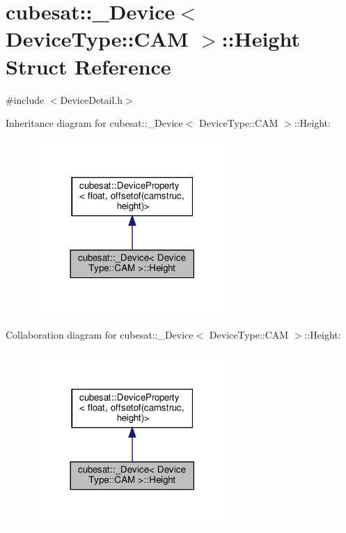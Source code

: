\hypertarget{structcubesat_1_1__Device_3_01DeviceType_1_1CAM_01_4_1_1Height}{}\section{cubesat\+:\+:\+\_\+\+Device$<$ Device\+Type\+:\+:C\+AM $>$\+:\+:Height Struct Reference}
\label{structcubesat_1_1__Device_3_01DeviceType_1_1CAM_01_4_1_1Height}


{\ttfamily \#include $<$Device\+Detail.\+h$>$}



Inheritance diagram for cubesat\+:\+:\+\_\+\+Device$<$ Device\+Type\+:\+:C\+AM $>$\+:\+:Height\+:\nopagebreak
\begin{figure}[H]
\begin{center}
\leavevmode
\includegraphics[width=213pt]{structcubesat_1_1__Device_3_01DeviceType_1_1CAM_01_4_1_1Height__inherit__graph}
\end{center}
\end{figure}


Collaboration diagram for cubesat\+:\+:\+\_\+\+Device$<$ Device\+Type\+:\+:C\+AM $>$\+:\+:Height\+:\nopagebreak
\begin{figure}[H]
\begin{center}
\leavevmode
\includegraphics[width=213pt]{structcubesat_1_1__Device_3_01DeviceType_1_1CAM_01_4_1_1Height__coll__graph}
\end{center}
\end{figure}
